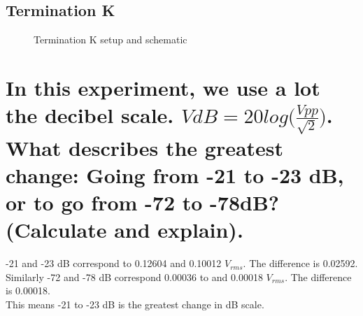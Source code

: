 \documentclass[12pt,a4paper,UKenglish]{article}
\begin{document}
\subsection{Termination K}
\begin{figure} [H]
  \centering 
\hfill
 \caption{Termination K setup and schematic} 
\label{fig:term_k} 
\end{figure}

\section{In this experiment, we use a lot the decibel scale. $VdB = 20log \big(\frac{Vpp}{\sqrt{2}}\big)$. \\
What describes the greatest change: Going from -21 to -23 dB, or to go from -72 to -78dB? (Calculate and explain).}
-21 and -23 dB correspond to 0.12604 and 0.10012 $V_{rms}$. The difference is 0.02592. \\
Similarly -72 and -78 dB correspond 0.00036 to and 0.00018 $V_{rms}$. The difference is 0.00018. \\
This means -21 to -23 dB is the greatest change in dB scale.
\end{document}
